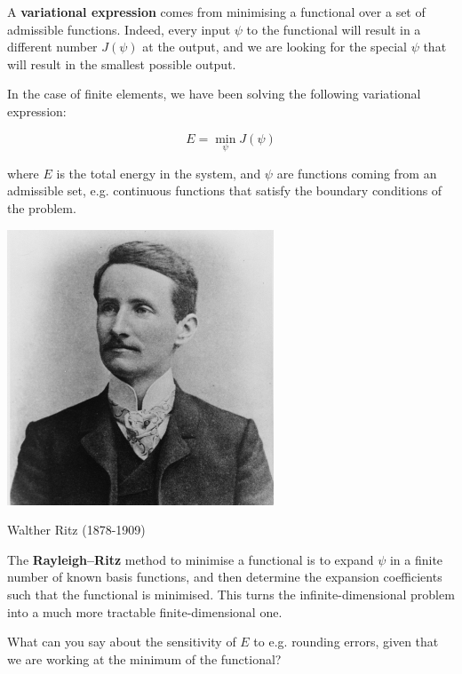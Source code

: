 A \textbf{variational expression} comes from minimising a functional over a set of admissible functions. Indeed, every input $\psi$ to the functional will result in a different number $J(\psi)$ at the output, and we are looking for the special $\psi$ that will result in the smallest possible output.

In the case of finite elements, we have been solving the following variational expression:

\begin{equation}
E = \min_\psi J(\psi)
\end{equation} 

where $E$ is the total energy in the system, and $\psi$ are functions coming from an admissible set, e.g. continuous functions that satisfy the boundary conditions of the problem.

\begin{marginfigure}[-1.5cm]
  \includegraphics{numeric/figures/w_ritz}
  \caption{Walther Ritz (1878-1909)}
\end{marginfigure}

The \textbf{Rayleigh--Ritz} method to minimise a functional is to expand $\psi$ in a finite number of known basis functions, and then determine the expansion coefficients such that the functional is minimised. This turns the infinite-dimensional problem into a much more tractable finite-dimensional one.

\begin{cue}
What can you say about the sensitivity of $E$ to e.g. rounding errors, given that we are working at the minimum of the functional? 
\end{cue}

